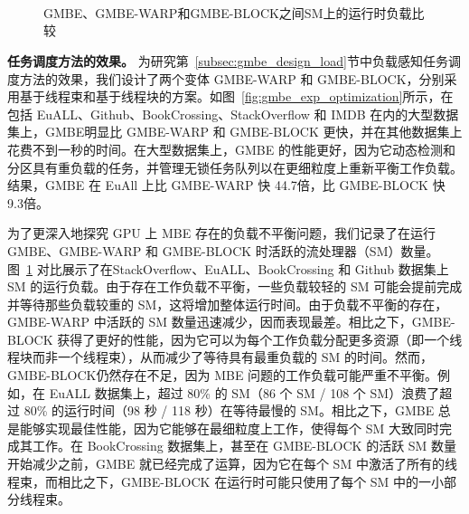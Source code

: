 \begin{figure} 
	\centering
   \\
	 \\
		\\

	\caption{GMBE、GMBE-WARP和GMBE-BLOCK之间SM上的运行时负载比较}

	\label{fig:gmbe_exp_balance}
\end{figure}


\textbf{任务调度方法的效果。} 为研究第~\ref{subsec:gmbe_design_load}节中负载感知任务调度方法的效果，我们设计了两个变体 GMBE-WARP 和 GMBE-BLOCK，分别采用基于线程束和基于线程块的方案。如图~\ref{fig:gmbe_exp_optimization}所示，在包括 EuALL、Github、BookCrossing、StackOverflow 和 IMDB 在内的大型数据集上，GMBE明显比 GMBE-WARP 和 GMBE-BLOCK 更快，并在其他数据集上花费不到一秒的时间。在大型数据集上，GMBE 的性能更好，因为它动态检测和分区具有重负载的任务，并管理无锁任务队列以在更细粒度上重新平衡工作负载。结果，GMBE 在 EuAll 上比 GMBE-WARP 快 44.7倍，比 GMBE-BLOCK 快 9.3倍。

为了更深入地探究 GPU 上 MBE 存在的负载不平衡问题，我们记录了在运行 GMBE、GMBE-WARP 和 GMBE-BLOCK 时活跃的流处理器（SM）数量。图~\ref{fig:gmbe_exp_balance} 对比展示了在StackOverflow、EuALL、BookCrossing 和 Github 数据集上 SM 的运行负载。由于存在工作负载不平衡，一些负载较轻的 SM 可能会提前完成并等待那些负载较重的 SM，这将增加整体运行时间。由于负载不平衡的存在，GMBE-WARP 中活跃的 SM 数量迅速减少，因而表现最差。相比之下，GMBE-BLOCK 获得了更好的性能，因为它可以为每个工作负载分配更多资源（即一个线程块而非一个线程束），从而减少了等待具有最重负载的 SM 的时间。然而，GMBE-BLOCK仍然存在不足，因为 MBE 问题的工作负载可能严重不平衡。例如，在 EuALL 数据集上，超过 80\% 的 SM（86 个 SM / 108 个 SM）浪费了超过 80\% 的运行时间（98 秒 / 118 秒）在等待最慢的 SM。相比之下，GMBE 总是能够实现最佳性能，因为它能够在最细粒度上工作，使得每个 SM 大致同时完成其工作。在 BookCrossing 数据集上，甚至在 GMBE-BLOCK 的活跃 SM 数量开始减少之前，GMBE 就已经完成了运算，因为它在每个 SM 中激活了所有的线程束，而相比之下，GMBE-BLOCK 在运行时可能只使用了每个 SM 中的一小部分线程束。

